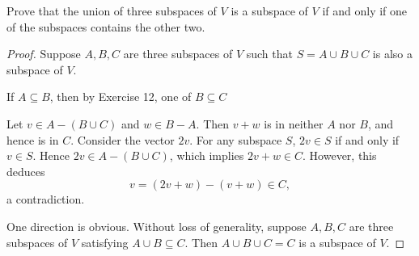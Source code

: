\begin{exercise}{13}
	Prove that the union of three subspaces of \( V \) is a subspace of \( V \) if and only if one of the subspaces contains the other two.

\end{exercise}

\begin{proof}
	Suppose \( A, B, C \) are three subspaces of \( V \) such that \( S = A \cup B \cup C \) is also a subspace of \( V \).

	If \( A \subseteq B \), then by Exercise 12, one of \( B \subseteq C \)
	
	Let \( v \in A - (B \cup C) \) and \( w \in B - A \). Then \( v + w \) is in neither \( A \) nor \( B \), and hence is in \( C \). Consider the vector \( 2v \). For any subspace \( S \), \( 2v \in S \) if and only if \( v \in S \). Hence \( 2v \in A - (B \cup C) \), which implies \( 2v + w \in C \). However, this deduces
	\[
		v = (2v + w) - (v + w) \in C,
	\]
	a contradiction.

	One direction is obvious. Without loss of generality, suppose \( A, B, C \) are three subspaces of \( V \) satisfying \( A \cup B \subseteq C \). Then \( A \cup B \cup C = C \) is a subspace of \( V \).
\end{proof}

